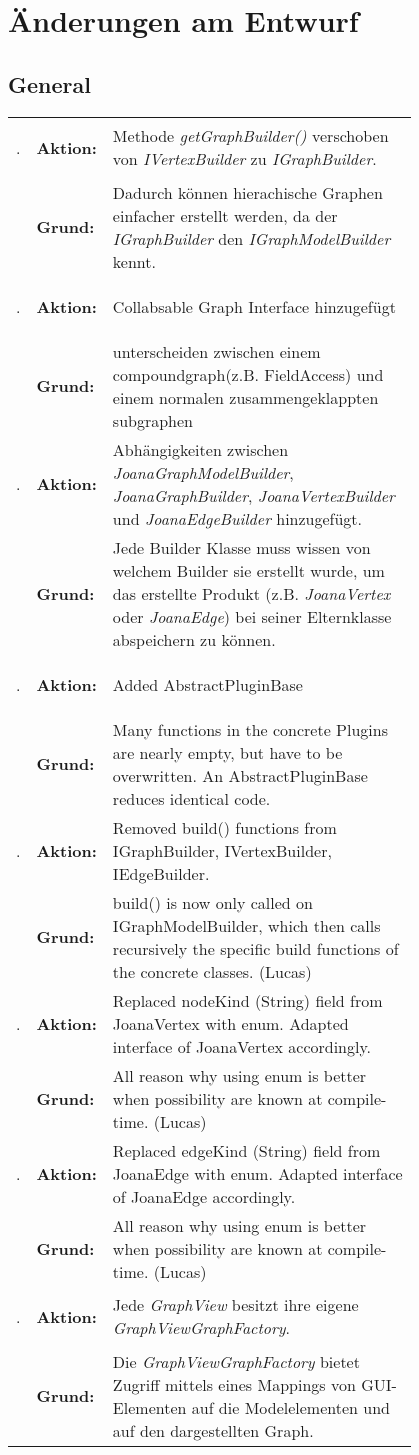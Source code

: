 \chapter{Änderungen am Entwurf}
\label{ch:aenderungen}

\newcommand\change[2]{\textbf{\arabic{cnr}}\addtocounter{cnr}{1}. & \textbf{Aktion:} & #1 \\ & \textbf{Grund:} & #2 \\ [1ex] }
	
\section{General}
\setcounter{cnr}{1}

\begin{longtable}{llp{0.8\linewidth}}
	\change	{Methode \textit{getGraphBuilder()} verschoben von \textit{IVertexBuilder} zu \textit{IGraphBuilder}.} 
			{Dadurch können hierachische Graphen einfacher erstellt werden, da der \textit{IGraphBuilder} den \textit{IGraphModelBuilder} kennt.}
	\change	{Collabsable Graph Interface hinzugefügt} 
			{unterscheiden zwischen einem compoundgraph(z.B. FieldAccess) und einem normalen zusammengeklappten subgraphen}
	\change	{Abhängigkeiten zwischen \textit{JoanaGraphModelBuilder}, \textit{JoanaGraphBuilder}, \textit{JoanaVertexBuilder} und \textit{JoanaEdgeBuilder} hinzugefügt.} 
			{Jede Builder Klasse muss wissen von welchem Builder sie erstellt wurde, um das erstellte Produkt (z.B. \textit{JoanaVertex} oder \textit{JoanaEdge}) bei seiner Elternklasse abspeichern zu können. }
	\change	{Added AbstractPluginBase} 
			{Many functions in the concrete Plugins are nearly empty, but have to be overwritten. An AbstractPluginBase reduces identical code.}
	\change	{Removed build() functions from IGraphBuilder, IVertexBuilder, IEdgeBuilder.} 
			{build() is now only called on IGraphModelBuilder, which then calls recursively the specific build functions of the concrete classes. (Lucas)}
	\change	{Replaced nodeKind (String) field from JoanaVertex with enum. Adapted interface of JoanaVertex accordingly.} 
			{All reason why using enum is better when possibility are known at compile-time.  (Lucas)}
	\change	{Replaced edgeKind (String) field from JoanaEdge with enum. Adapted interface of JoanaEdge accordingly.} 
			{All reason why using enum is better when possibility are known at compile-time.  (Lucas)}
	\change	{Jede \textit{GraphView} besitzt ihre eigene \textit{GraphViewGraphFactory}.}
			{Die \textit{GraphViewGraphFactory} bietet Zugriff mittels eines Mappings von GUI-Elementen auf die Modelelementen und auf den dargestellten Graph.}

\end{longtable}
